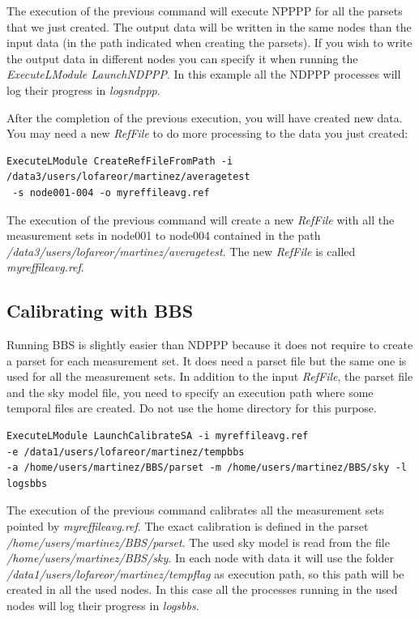 \documentclass[a4paper,11pt]{article}
\begin{document}
The execution of the previous command will execute NPPPP for all the parsets that we just created. The output data will be written in the same nodes than the input data (in the path indicated when creating the parsets). If you wish to write the output data in different nodes you can specify it when running the \textit{ExecuteLModule LaunchNDPPP}. In this example all the NDPPP processes will log their progress in \textit{logsndppp}.

After the completion of the previous execution, you will have created new data. You may need a new \textit{RefFile} to do more processing to the data you just created:

\begin{verbatim}
ExecuteLModule CreateRefFileFromPath -i /data3/users/lofareor/martinez/averagetest
 -s node001-004 -o myreffileavg.ref
\end{verbatim}

The execution of the previous command will create a new \textit{RefFile} with all the measurement sets in node001 to node004 contained in the path \textit{/data3/users/lofareor/martinez/averagetest}. The new \textit{RefFile} is called 
\textit{myreffileavg.ref}.

\subsection{Calibrating with BBS}

Running BBS is slightly easier than NDPPP because it does not require to create a parset for each measurement set. It does need a parset file but the same one is used for all the measurement sets. In addition to the input \textit{RefFile}, the parset file and the sky model file, you need to specify an execution path where some temporal files are created. Do not use the home directory for this purpose. 

\begin{verbatim}
ExecuteLModule LaunchCalibrateSA -i myreffileavg.ref 
-e /data1/users/lofareor/martinez/tempbbs 
-a /home/users/martinez/BBS/parset -m /home/users/martinez/BBS/sky -l logsbbs
\end{verbatim}

The execution of the previous command calibrates all the measurement sets pointed by \textit{myreffileavg.ref}. The exact calibration is defined in the parset \textit{/home/users/martinez/BBS/parset}. The used sky model is read from the file \textit{/home/users/martinez/BBS/sky}. In each node with data it will use the folder \textit{/data1/users/lofareor/martinez/tempflag} as execution path, so this path will be created in all the used nodes. In this case all the processes running in the used nodes will log their progress in \textit{logsbbs}.
\end{document}
